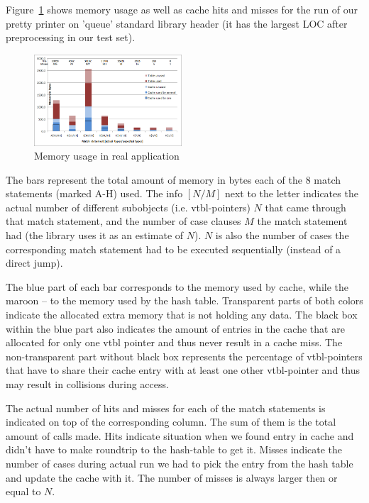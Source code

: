 Figure~\ref{fig:mem} shows memory usage as well as cache hits and misses for 
the run of our pretty printer on 'queue' standard library header (it has the 
largest LOC after preprocessing in our test set).

\begin{figure}[htbp]
  \centering
    \includegraphics[width=0.49\textwidth]{Memory.png}
  \caption{Memory usage in real application}
  \label{fig:mem}
\end{figure}

The bars represent the total amount of memory in bytes each of the 8 match 
statements (marked A-H) used. The info $[N/M]$ next to the letter indicates the 
actual number of different subobjects (i.e. vtbl-pointers) $N$ that came through 
that match statement, and the number of case clauses $M$ the match statement had 
(the library uses it as an estimate of $N$). $N$ is also the number of cases the 
corresponding match statement had to be executed sequentially (instead of a 
direct jump).

The blue part of each bar corresponds to the memory used by cache, while the 
maroon -- to the memory used by the hash table. Transparent parts of both colors 
indicate the allocated extra memory that is not holding any data.  The black box 
within the blue part also indicates the amount of entries in the cache that are 
allocated for only one vtbl pointer and thus never result in a cache miss. The 
non-transparent part without black box represents the percentage of 
vtbl-pointers that have to share their cache entry with at least one other 
vtbl-pointer and thus may result in collisions during access. 

The actual number of hits and misses for each of the match statements is 
indicated on top of the corresponding column. The sum of them is the total 
amount of calls made. Hits indicate situation when we found entry in cache and 
didn't have to make roundtrip to the hash-table to get it. Misses indicate the 
number of cases during actual run we had to pick the entry from the hash table 
and update the cache with it. The number of misses is always larger then or 
equal to $N$.

